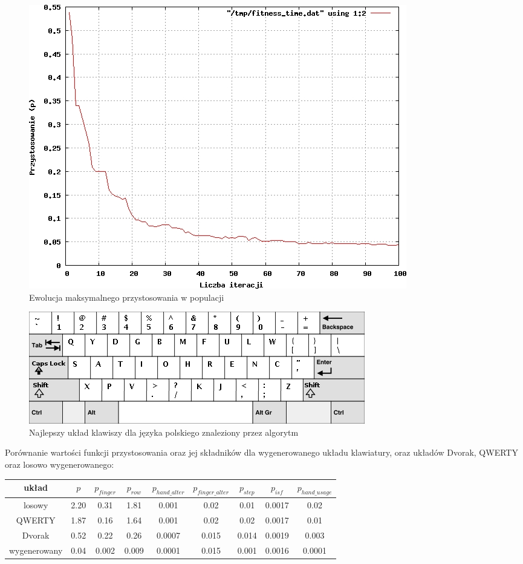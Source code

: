 \documentclass[brudnopis]{xmgr}
\begin{document}
\begin{figure}[!tbh]
\centering
\includegraphics[width=.8\hsize]{fig/fitness_time_pl}
\caption{Ewolucja maksymalnego przystosowania w populacji}
\end{figure}

\begin{figure}[!tbh]
\centering
\includegraphics[width=.8\hsize]{fig/best_en}
\caption{Najlepszy układ klawiszy dla języka polskiego znaleziony przez algorytm}
\end{figure}

Porównanie wartości funkcji przystosowania oraz jej składników dla wygenerowanego układu klawiatury, oraz układów Dvorak, QWERTY oraz losowo wygenerowanego:\newline
\begin{tabular}{ c | c | c | c | c | c | c | c | c }
  układ & $p$ & $p_{finger}$ & $p_{row}$ & $p_{hand\_alter}$ & $p_{finger\_alter}$ & $p_{step}$ & $p_{isf}$ & $p_{hand\_usage}$ \\
  \hline
  losowy       & 2.20 & 0.31 & 1.81 & 0.001 & 0.02 & 0.01 & 0.0017 & 0.02 \\
  QWERTY       & 1.87 & 0.16 & 1.64 & 0.001 & 0.02 & 0.02 & 0.0017 & 0.01  \\
  Dvorak       & 0.52 & 0.22 & 0.26 & 0.0007 & 0.015 & 0.014 & 0.0019 & 0.003  \\
  wygenerowany & 0.04 & 0.002 & 0.009 & 0.0001 & 0.015 & 0.001 & 0.0016 & 0.0001  \\
\end{tabular}\newline\newline
\end{document}
